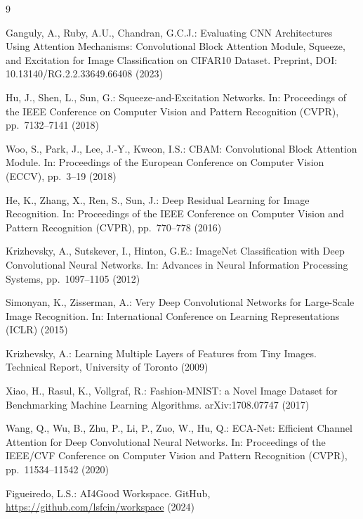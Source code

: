 \documentclass[runningheads]{llncs}
\begin{document}
\begin{thebibliography}{9}

Ganguly, A., Ruby, A.U., Chandran, G.C.J.:
Evaluating CNN Architectures Using Attention Mechanisms: Convolutional
Block Attention Module, Squeeze, and Excitation for Image Classification
on CIFAR10 Dataset.
Preprint, DOI: 10.13140/RG.2.2.33649.66408 (2023)

Hu, J., Shen, L., Sun, G.:
Squeeze-and-Excitation Networks.
In: Proceedings of the IEEE Conference on Computer Vision and Pattern
Recognition (CVPR), pp.~7132--7141 (2018)

Woo, S., Park, J., Lee, J.-Y., Kweon, I.S.:
CBAM: Convolutional Block Attention Module.
In: Proceedings of the European Conference on Computer Vision (ECCV),
pp.~3--19 (2018)

He, K., Zhang, X., Ren, S., Sun, J.:
Deep Residual Learning for Image Recognition.
In: Proceedings of the IEEE Conference on Computer Vision and Pattern
Recognition (CVPR), pp.~770--778 (2016)

Krizhevsky, A., Sutskever, I., Hinton, G.E.:
ImageNet Classification with Deep Convolutional Neural Networks.
In: Advances in Neural Information Processing Systems, pp.~1097--1105
(2012)

Simonyan, K., Zisserman, A.:
Very Deep Convolutional Networks for Large-Scale Image Recognition.
In: International Conference on Learning Representations (ICLR) (2015)

Krizhevsky, A.:
Learning Multiple Layers of Features from Tiny Images.
Technical Report, University of Toronto (2009)

Xiao, H., Rasul, K., Vollgraf, R.:
Fashion-MNIST: a Novel Image Dataset for Benchmarking Machine Learning
Algorithms.
arXiv:1708.07747 (2017)

Wang, Q., Wu, B., Zhu, P., Li, P., Zuo, W., Hu, Q.:
ECA-Net: Efficient Channel Attention for Deep Convolutional Neural
Networks.
In: Proceedings of the IEEE/CVF Conference on Computer Vision and
Pattern Recognition (CVPR), pp.~11534--11542 (2020)

Figueiredo, L.S.: AI4Good Workspace.
GitHub, \url{https://github.com/lsfcin/workspace} (2024)

\end{thebibliography}
\end{document}
